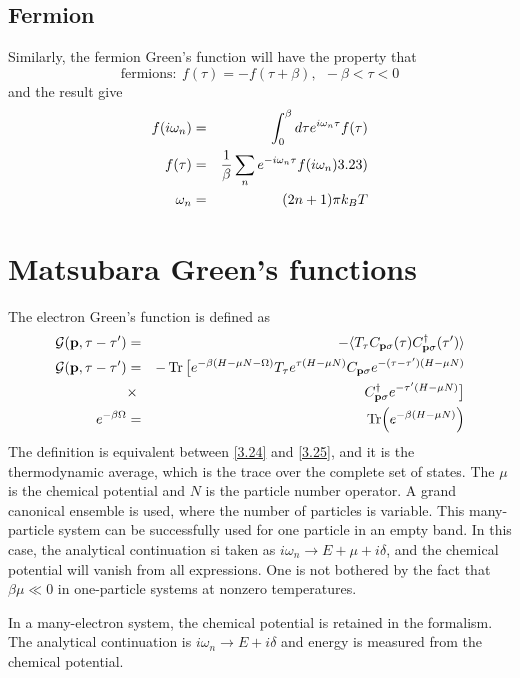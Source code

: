 \subsection{Fermion}
Similarly, the fermion Green's function will have the property that
\begin{equation}
  \label{3.21}
  \mathrm{fermions:}~ f(\tau) = - f(\tau+ \beta),~ ~ -\beta<\tau<0
\end{equation}
and the result give
\begin{eqnarray}
  f(i\omega_n)&=&\int_0^\beta d\tau e^{i\omega_n\tau}f(\tau) \nonumber \\
  f(\tau)&=&\frac{1}{\beta}\sum_n e^{-i\omega_n\tau}f(i\omega_n) \label(3.23) \\
  \omega_n &=&(2n+1)\pi k_B T \nonumber
\end{eqnarray}

\section{Matsubara Green's functions}\label{s3.2}
The electron Green's function is defined as
\begin{eqnarray}
  \mathcal{G}(\mathbf{p},\tau-\tau') &=& - \langle T_\tau C_{\mathbf{p}\sigma}(\tau)C^\dagger_{\mathbf{p}\sigma}(\tau') \rangle  \label{3.24} \\
  \mathcal{G}(\mathbf{p},\tau-\tau')&=& -\Tr \big[e^{-\beta(H-\mu N -\Omega)} T_\tau e^{\tau(H-\mu N)} C_{\mathbf{p}\sigma}e^{-(\tau-\tau')(H-\mu N)} \nonumber \\
  &\times& C^\dagger_{\mathbf{p}\sigma} e^{-\tau'(H-\mu N)} \big] \label{3.25} \\
  e^{-\beta \Omega} &=& \Tr(e^{-\beta(H-\mu N)}) \label{3.26}
\end{eqnarray}
The definition is equivalent between \eqref{3.24} and \eqref{3.25}, and it is the thermodynamic average, which is the trace over the complete set of states.
The $\mu$ is the chemical potential and $N$ is the particle number operator.
A grand canonical ensemble is used, where the number of particles is variable.
This many-particle system can be successfully used for one particle in an empty band.
In this case, the analytical continuation si taken as $i\omega_n \to E+ \mu + i\delta$, and the chemical potential will vanish from all expressions.
One is not bothered by the fact that $\beta \mu \ll 0$ in one-particle systems at nonzero temperatures.

In a many-electron system, the chemical potential is retained in the formalism.
The analytical continuation is $i\omega_n \to E+ i\delta$ and energy is measured from the chemical potential.

